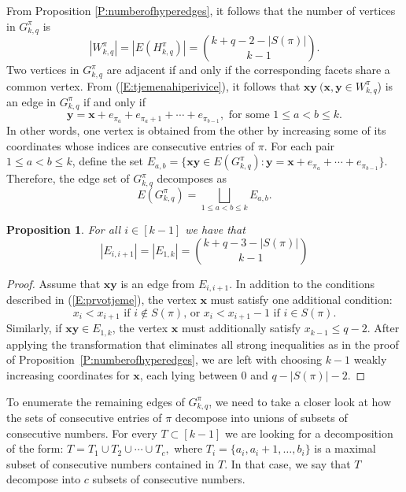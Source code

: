 \documentclass{birkjour}
\newtheorem{prop}[thm]{Proposition}
\theoremstyle{definition}
\theoremstyle{remark}
\numberwithin{equation}{section}
\begin{document}
From Proposition \ref{P:numberofhyperedges}, it follows that the
number of vertices in $G^{\pi}_{k,q}$ is
$$|W^\pi_{k,q}|=|E(H^\pi_{k,q})|={k+q-2-|S(\pi)|\choose k-1}.$$
Two vertices in $G^{\pi}_{k,q}$ are adjacent if and only if the
corresponding facets share a common vertex. From
(\ref{E:tjemenahiperivice}), it follows that $\mathbf{xy}\
(\mathbf{x},\mathbf{y}\in W^\pi_{k,q}$) is an
 edge in
 $G^{\pi}_{k,q}$ if and only if
\begin{equation}\label{ivica}
\mathbf{y}=\mathbf{x}+e_{\pi_a}+
e_{\pi_{a}+1}+\cdots+e_{\pi_{b-1}}, \textrm{ for some }1\leq a<b
\leq k.
\end{equation} In other words, one vertex is obtained
from the other by increasing some of its coordinates whose indices
are consecutive entries of $\pi$. For each pair $1\leq a<b \leq
k$, define the set $E_{a,b}=\{\mathbf{x}\mathbf{y}\in
E(G^\pi_{k,q}):\mathbf{y}=
\mathbf{x}+e_{\pi_a}+\cdots+e_{\pi_{b-1}}\}$. Therefore, the edge
set of $G^\pi_{k,q}$ decomposes as
\begin{equation}\label{E:edgesss}
E(G^\pi_{k,q})=\bigsqcup_{1\leq a<b \leq k}E_{a,b}.
\end{equation}


\begin{prop}\label{P:edgesconsec} For all $i\in[k-1]$ we have that
$$|E_{i,i+1}|=|E_{1,k}|={k+q-3-|S(\pi)|\choose k-1}$$
\end{prop}
\begin{proof} Assume that $\mathbf{xy}$ is an edge from $E_{i,i+1}$.
In addition to the conditions described in (\ref{E:prvotjeme}),
the vertex $\mathbf{x}$ must satisfy one additional condition:
$$x_i<x_{i+1}\textrm{ if }i \notin S(\pi)
\textrm{,  or } x_i<x_{i+1}-1\textrm{ if }i \in S(\pi).$$
Similarly, if $\mathbf{xy}\in E_{1,k}$, the vertex $\mathbf{x}$
must additionally satisfy $x_{k-1}\leq q-2$. After applying the
transformation that eliminates all strong inequalities as in the
proof of Proposition~\ref{P:numberofhyperedges}, we are left with
choosing $k-1$ weakly increasing coordinates for $\mathbf{x}$,
each lying between $0$ and $q-|S(\pi)|-2$.
\end{proof}

\noindent To enumerate the remaining edges of $G^{\pi}_{k,q}$, we
need to take a closer look at how the sets of consecutive entries
of $\pi$ decompose into unions of subsets of consecutive numbers.
For every $T\subset [k-1]$ we are looking for a decomposition of the
form: $T=T_1\cup T_2\cup\cdots\cup T_c,$ where
$T_i=\{a_i,a_i+1,\ldots,b_i\}$ is a maximal subset of consecutive
numbers contained in $T$. In that case, we say that $T$ decompose
into $c$ subsets of consecutive numbers.
\end{document}

